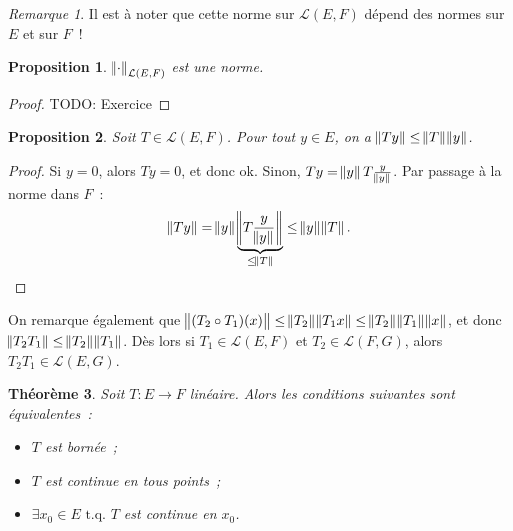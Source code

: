 \documentclass{report}
\newcommand{\tq}{\text{ t.q. }}
\newcommand{\st}{\tq}
\newcommand{\TODO}{TODO}
\newtheorem{thm}{Théorème}[chapter]
\newtheorem{prp}[thm]{Proposition}
\theoremstyle{definition}
\theoremstyle{remark}
\newtheorem*{rmq}{Remarque}
\begin{document}
\begin{rmq} Il est à noter que cette norme sur $\mathcal L(E, F)$ dépend des normes sur $E$ et sur $F$~!
\end{rmq}

\begin{prp} $\norm \cdot_{\mathcal L(E, F)}$ est une norme.
\end{prp}

\begin{proof} \TODO: Exercice
\end{proof}

\begin{prp} Soit $T \in \mathcal L(E, F)$. Pour tout $y \in E$, on a $\norm {Ty} \leq \norm T\norm y$.
\end{prp}

\begin{proof} Si $y = 0$, alors $Ty = 0$, et donc ok. Sinon, $Ty = \norm yT\frac y{\norm y}$. Par passage à la norme dans $F$~:
\[\norm {Ty} = \norm y \underbrace {\norm {T\frac y{\norm y}}}_{\leq \norm T} \leq \norm y\norm T.\]
\end{proof}

On remarque également que $\norm {(T_2 \circ T_1)(x)} \leq \norm {T_2}\norm {T_1x} \leq \norm {T_2}\norm {T_1}\norm x$, et donc $\norm {T_2T_1} \leq \norm {T_2}\norm {T_1}$. Dès lors
si $T_1 \in \mathcal L(E, F)$ et $T_2 \in \mathcal L(F, G)$, alors $T_2T_1 \in \mathcal L(E, G)$.

\begin{thm}\label{thm:opérateur continu ssi borné} Soit $T : E \to F$ linéaire. Alors les conditions suivantes sont équivalentes~:
\begin{itemize}
	\item[$(i)$]   $T$ est bornée~;
	\item[$(ii)$]  $T$ est continue en tous points~;
	\item[$(iii)$] $\exists x_0 \in E \st T$ est continue en $x_0$.
\end{itemize}
\end{thm}
\end{document}
